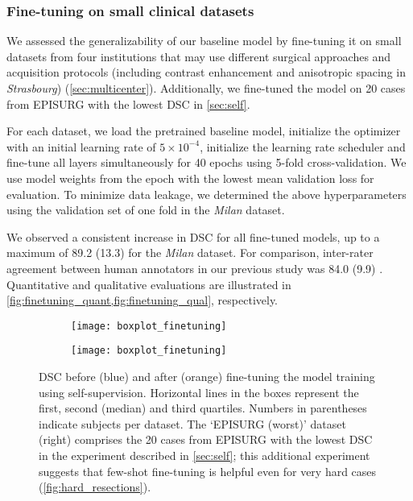 \subsubsection{Fine-tuning on small clinical datasets}

We assessed the generalizability of our baseline model by fine-tuning it on small datasets from four institutions that may use different surgical approaches and acquisition protocols (including contrast enhancement and anisotropic spacing in \textit{Strasbourg}) (\cref{sec:multicenter}).
Additionally, we fine-tuned the model on 20 cases from EPISURG with the lowest \ac{DSC} in \cref{sec:self}.

For each dataset, we load the pretrained baseline model, initialize the optimizer with an initial learning rate of $5 \times 10^{-4}$, initialize the learning rate scheduler and fine-tune all layers simultaneously for 40 epochs using 5-fold cross-validation.
We use model weights from the epoch with the lowest mean validation loss for evaluation.
To minimize data leakage, we determined the above hyperparameters using the validation set of one fold in the \textit{Milan} dataset.

We observed a consistent increase in \ac{DSC} for all fine-tuned models, up to a maximum of 89.2 (13.3) for the \textit{Milan} dataset.
For comparison, inter-rater agreement between human annotators in our previous study was 84.0 (9.9) \cite{perez-garcia_simulation_2020}.
Quantitative and qualitative evaluations are illustrated in \cref{fig:finetuning_quant,fig:finetuning_qual}, respectively.


\begin{figure}
  \centering
  \begin{subfigure}[b]{0.70\linewidth}
    \centering
    \texttt{[image: boxplot\_finetuning]}
  \end{subfigure}
  \hfill
  \begin{subfigure}[b]{0.205\linewidth}
    \centering
    \texttt{[image: boxplot\_finetuning]}
  \end{subfigure}
  \caption[Dice score without before and after fine-tuning]{
    \acf{DSC} before (blue) and after (orange) fine-tuning the model training using self-supervision.
    Horizontal lines in the boxes represent the first, second (median) and third quartiles.
    Numbers in parentheses indicate subjects per dataset.
    The `EPISURG (worst)' dataset (right) comprises the 20 cases from EPISURG with the lowest \ac{DSC} in the experiment described in \cref{sec:self}; this additional experiment suggests that few-shot fine-tuning is helpful even for very hard cases (\cref{fig:hard_resections}).
  }
  \label{fig:finetuning_quant}
\end{figure}


